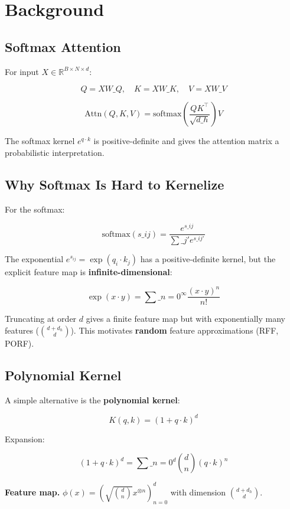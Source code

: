 \section{Background}

\subsection{Softmax Attention}

For input $X \in \mathbb{R}^{B \times N \times d}$:

\[
Q = X W\_Q, \quad K = X W\_K, \quad V = X W\_V
\tag{3.1}
\]

\[
\text{Attn}(Q, K, V) = \text{softmax}\!\left(\frac{Q K^\top}{\sqrt{d\_h}}\right) V
\tag{3.2}
\]

The softmax kernel $e^{q \cdot k}$ is positive-definite and gives the 
attention matrix a probabilistic interpretation.

\subsection{Why Softmax Is Hard to Kernelize}

For the softmax:

\[
\text{softmax}(s\_{ij}) = \frac{e^{s\_{ij}}}{\sum\_{j'} e^{s\_{ij'}}}
\tag{3.3}
\]

The exponential $e^{s_{ij}} = \exp(q_i \cdot k_j)$ has a positive-definite 
kernel, but the explicit feature map is \textbf{infinite-dimensional}:

\[
\exp(x \cdot y) = \sum\_{n=0}^\infty \frac{(x \cdot y)^n}{n!}
\tag{3.4}
\]

Truncating at order $d$ gives a finite feature map but with exponentially 
many features ($\binom{d + d_h}{d}$). This motivates \textbf{random} feature 
approximations (RFF, PORF).

\subsection{Polynomial Kernel}

A simple alternative is the \textbf{polynomial kernel}:

\[
K(q, k) = (1 + q \cdot k)^d
\tag{3.5}
\]

Expansion:

\[
(1 + q \cdot k)^d = \sum\_{n=0}^d \binom{d}{n} (q \cdot k)^n
\tag{3.6}
\]

\textbf{Feature map.} $\phi(x) = \left( \sqrt{\binom{d}{n}} x^{\otimes n} \right)_{n=0}^d$ with dimension 
$\binom{d + d_h}{d}$.

